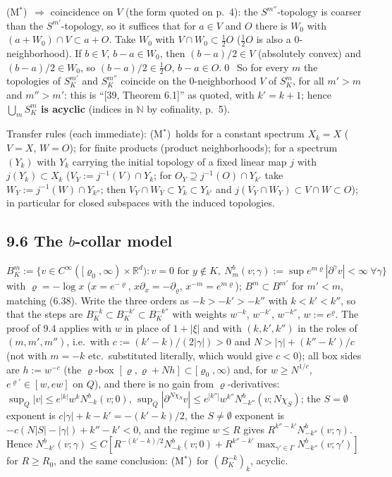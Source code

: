 \documentclass[11pt]{article}
\newcommand{\R}{\mathbb{R}}
\newcommand{\N}{\mathbb{N}}
\newcommand{\Mstar}{(M$^*$)}
\begin{document}
\Mstar\ $\Rightarrow$ coincidence on $V$ (the form quoted on p.~4): the $S^{m''}$-topology is coarser than the $S^{m'}$-topology, so it suffices that for $a\in V$ and $O$ there is $W_0$ with $(a+W_0)\cap V\subset a+O$. Take $W_0$ with $V\cap W_0\subset\tfrac12O$ ($\tfrac12O$ is also a 0-neighborhood). If $b\in V$, $b-a\in W_0$, then $(b-a)/2\in V$ (absolutely convex) and $(b-a)/2\in W_0$, so $(b-a)/2\in\tfrac12O$, $b-a\in O$.\qed\ So for every $m$ the topologies of $S^{m'}_K$ and $S^{m''}_K$ coincide on the 0-neighborhood $V$ of $S^m_K$, for all $m'>m$ and $m''>m'$: this is ``[39, Theorem 6.1]'' as quoted, with $k'=k+1$; hence \textbf{$\bigcup_mS^m_K$ is acyclic} (indices in $\N$ by cofinality, p.~5).

Transfer rules (each immediate): \Mstar\ holds for a constant spectrum $X_k=X$ ($V=X$, $W=O$); for finite products (product neighborhoods); for a spectrum $(Y_k)$ with $Y_k$ carrying the initial topology of a fixed linear map $j$ with $j(Y_k)\subset X_k$ ($V_Y:=j^{-1}(V)\cap Y_k$; for $O_Y\supseteq j^{-1}(O)\cap Y_{k'}$ take $W_Y:=j^{-1}(W)\cap Y_{k''}$; then $V_Y\cap W_Y\subset Y_k\subset Y_{k'}$ and $j(V_Y\cap W_Y)\subset V\cap W\subset O$); in particular for closed subspaces with the induced topologies.

\subsection*{9.6 The $b$-collar model}
$B^m_K:=\{v\in C^\infty([\varrho_0,\infty)\times\R^d):v=0\text{ for }y\notin K,\ N^b_m(v;\gamma):=\sup e^{m\varrho}|\partial^\gamma v|<\infty\ \forall\gamma\}$ with $\varrho=-\log x$ ($x=e^{-\varrho}$, $x\partial_x=-\partial_\varrho$, $x^{-m}=e^{m\varrho}$); $B^m\subset B^{m'}$ for $m'<m$, matching (6.38). Write the three orders as $-k>-k'>-k''$ with $k<k'<k''$, so that the steps are $B^{-k}_K\subset B^{-k'}_K\subset B^{-k''}_K$ with weights $w^{-k}$, $w^{-k'}$, $w^{-k''}$, $w:=e^\varrho$. The proof of 9.4 applies with $w$ in place of $1+|\xi|$ and with $(k,k',k'')$ in the roles of $(m,m',m'')$, i.e.\ with $c:=(k'-k)/(2|\gamma|)>0$ and $N>|\gamma|+(k''-k')/c$ (not with $m=-k$ etc.\ substituted literally, which would give $c<0$); all box sides are $h:=w^{-c}$ (the $\varrho$-box $[\varrho,\varrho+Nh]\subset[\varrho_0,\infty)$ and, for $w\ge N^{1/c}$, $e^{\varrho'}\in[w,ew]$ on $Q$), and there is no gain from $\varrho$-derivatives: $\sup_Q|v|\le e^{|k|}w^kN^b_{-k}(v;0)$, $\sup_Q|\partial^{N\chi_S}v|\le e^{|k''|}w^{k''}N^b_{-k''}(v;N\chi_S)$; the $S=\emptyset$ exponent is $c|\gamma|+k-k'=-(k'-k)/2$, the $S\ne\emptyset$ exponent is $-c(N|S|-|\gamma|)+k''-k'<0$, and the regime $w\le R$ gives $R^{k''-k'}N^b_{-k''}(v;\gamma)$. Hence $N^b_{-k'}(v;\gamma)\le C[R^{-(k'-k)/2}N^b_{-k}(v;0)+R^{k''-k'}\max_{\gamma'\in\Gamma}N^b_{-k''}(v;\gamma')]$ for $R\ge R_0$, and the same conclusion: \Mstar\ for $(B^{-k}_K)_k$, acyclic.
\end{document}
